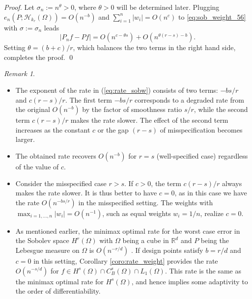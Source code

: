 \documentclass[11pt]{article}
\theoremstyle{remark}
\newtheorem{remark}{Remark}
\theoremstyle{example}
\theoremstyle{remark}
\renewcommand{\H}{{\mathcal{H}}}
\newcommand{\R}{\mathbb{R}}
\begin{document}
\begin{proof}
Let $\sigma_n := n^\theta > 0$, where $\theta > 0$ will be determined later.  
Plugging $e_n(P;\H_{k_r}(\Omega)) = O(n^{-b})$ and $\sum_{i=1}^n | w_i | = O(n^c)$ to \eqref{eq:sob_weight_56} with $\sigma := \sigma_n$ leads 
\begin{equation*} %
| P_n f - P f| 
= O( n^{c - \theta s} ) + O( n^{ \theta(r-s) - b } ).
\end{equation*}
Setting $\theta = (b+c)/r$, which balances the two terms in the right hand side, completes the proof. \qed
\end{proof}
\begin{remark} 
\begin{itemize}
\item 
The exponent of the rate in (\ref{eq:rate_sobw}) consists of two terms: $-bs/r$ and $c(r-s)/r$.
The first term $-bs/r$ corresponds to a degraded rate from the original $O(n^{-b})$ by the factor of smoothness ratio $s/r$, while 
the second term $c(r-s)/r$ makes the rate slower.
The effect of the second term increases as the constant $c$ or the gap $(r-s)$ of misspecification becomes larger.\vspace{-1mm}

\item 
The obtained rate recovers $O(n^{-b})$ for $r=s$ (well-specified case) regardless of the value of $c$. 
\vspace{-1mm}%

\item Consider the misspecified case $r>s$.
If $c>0$, the term $c(r-s)/r$ always makes the rate slower. 
It is thus better to have $c=0$, as in this case we have the rate $O(n^{-bs/r})$ in the misspecified setting.
The weights with $\max_{i=1,\dots,n} |w_i| = O(n^{-1})$, such as equal weights $w_i=1/n$, realize $c=0$. 
\vspace{-1mm}

\item 
As mentioned earlier, the minimax optimal rate for the worst case error in the Sobolev space $H^r(\Omega)$ with $\Omega$ being a cube in $\R^d$ and $P$ being the Lebesgue measure on $\Omega$ is $O(n^{-r/d})$ \cite[Proposition 1 in Section 1.3.12]{Nov88}.
If design points satisfy $b = r/d$ and $c = 0$ in this setting, Corollary \ref{coro:rate_weight} provides the rate $O(n^{-s/d})$ for $f \in H^s(\Omega) \cap C_B^s(\Omega) \cap L_1(\Omega)$.
This rate is the same as the minimax optimal rate for $H^s(\Omega)$, and hence implies some adaptivity to the order of differentiability. \vspace{-1mm}


\end{itemize}
\end{remark}
\end{document}
